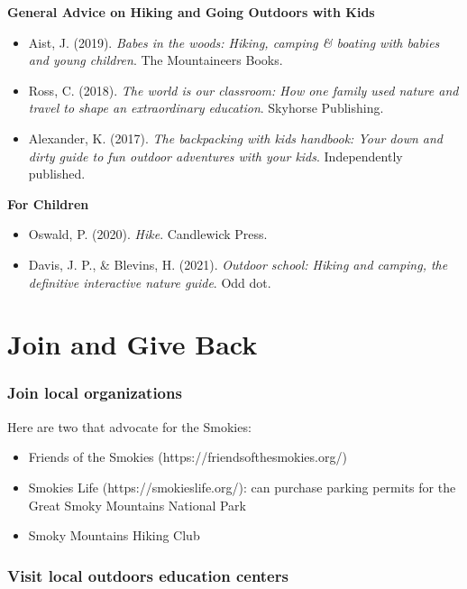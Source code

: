 \documentclass[
  letterpaper,
  DIV=11,
  numbers=noendperiod]{scrreprt}
\providecommand{\tightlist}{%
  \setlength{\itemsep}{0pt}\setlength{\parskip}{0pt}}\usepackage{longtable,booktabs,array}
\begin{document}
\textbf{General Advice on Hiking and Going Outdoors with Kids}

\begin{itemize}
\item
  Aist, J. (2019). \emph{Babes in the woods: Hiking, camping \& boating
  with babies and young children}. The Mountaineers Books.
\item
  Ross, C. (2018). \emph{The world is our classroom: How one family used
  nature and travel to shape an extraordinary education}. Skyhorse
  Publishing.
\item
  Alexander, K. (2017). \emph{The backpacking with kids handbook: Your
  down and dirty guide to fun outdoor adventures with your kids}.
  Independently published.
\end{itemize}

\textbf{For Children}

\begin{itemize}
\item
  Oswald, P. (2020). \emph{Hike}. Candlewick Press.
\item
  Davis, J. P., \& Blevins, H. (2021). \emph{Outdoor school: Hiking and
  camping, the definitive interactive nature guide}. Odd dot.
\end{itemize}

\chapter{Join and Give Back}\label{join-and-give-back}

\subsection{Join local organizations}\label{join-local-organizations}

Here are two that advocate for the Smokies:

\begin{itemize}
\tightlist
\item
  Friends of the Smokies (https://friendsofthesmokies.org/)
\item
  Smokies Life (https://smokieslife.org/): can purchase parking permits
  for the Great Smoky Mountains National Park
\item
  Smoky Mountains Hiking Club
\end{itemize}

\subsection{Visit local outdoors education
centers}\label{visit-local-outdoors-education-centers}
\end{document}
